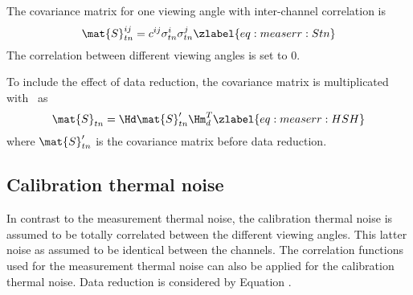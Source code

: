  The covariance matrix for one viewing angle with inter-channel
 correlation is
 \begin{equation}
   \mat{S}_{tn}^{ij} = c^{ij} \sigma_{tn}^i \sigma_{tn}^j
  \zlabel{eq:measerr:Stn}
 \end{equation}
 The correlation between different viewing angles is set to 0.

 To include the effect of data reduction, the covariance matrix is
 multiplicated with \Hd\ as
 \begin{equation}
   \mat{S}_{tn} = \Hd \mat{S}_{tn}' \Hm_d^T 
   \zlabel{eq:measerr:HSH}
 \end{equation}
 where $\mat{S}_{tn}'$ is the covariance matrix before data reduction.


 \subsection{Calibration thermal noise}
 
 In contrast to the measurement thermal noise, the calibration thermal
 noise is assumed to be totally correlated between the different
 viewing angles. This latter noise as assumed to be identical between the
 channels.
 The correlation functions used for the measurement thermal noise can
 also be applied for the calibration thermal noise.  
 Data reduction is considered by Equation .
 


